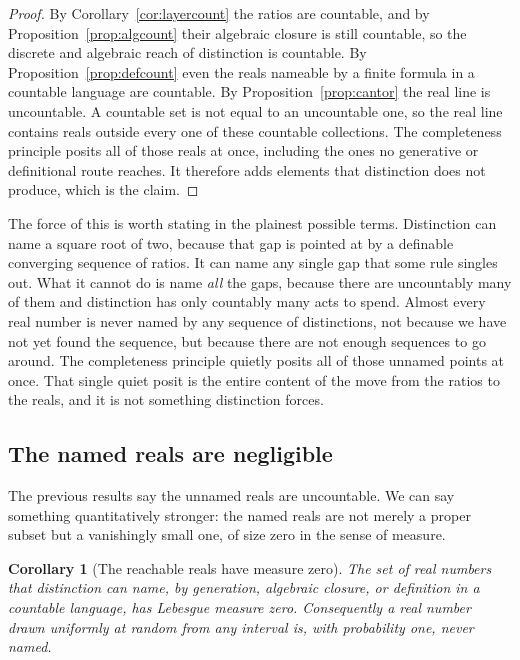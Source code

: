 \documentclass[11pt,a4paper]{article}
\newtheorem{corollary}[theorem]{Corollary}
\theoremstyle{definition}
\theoremstyle{remark}
\begin{document}
\begin{proof}
By Corollary~\ref{cor:layercount} the ratios are countable, and by
Proposition~\ref{prop:algcount} their algebraic closure is still countable, so
the discrete and algebraic reach of distinction is countable. By
Proposition~\ref{prop:defcount} even the reals nameable by a finite formula in a
countable language are countable. By Proposition~\ref{prop:cantor} the real line
is uncountable. A countable set is not equal to an uncountable one, so the real
line contains reals outside every one of these countable collections. The
completeness principle posits all of those reals at once, including the ones no
generative or definitional route reaches. It therefore adds elements that
distinction does not produce, which is the claim.
\end{proof}

The force of this is worth stating in the plainest possible terms. Distinction
can name a square root of two, because that gap is pointed at by a definable
converging sequence of ratios. It can name any single gap that some rule
singles out. What it cannot do is name \emph{all} the gaps, because there are
uncountably many of them and distinction has only countably many acts to spend.
Almost every real number is never named by any sequence of distinctions, not
because we have not yet found the sequence, but because there are not enough
sequences to go around. The completeness principle quietly posits all of those
unnamed points at once. That single quiet posit is the entire content of the
move from the ratios to the reals, and it is not something distinction forces.

\subsection{The named reals are negligible}

The previous results say the unnamed reals are uncountable. We can say something
quantitatively stronger: the named reals are not merely a proper subset but a
vanishingly small one, of size zero in the sense of measure.

\begin{corollary}[The reachable reals have measure zero]\label{cor:measure}
The set of real numbers that distinction can name, by generation, algebraic
closure, or definition in a countable language, has Lebesgue measure zero.
Consequently a real number drawn uniformly at random from any interval is, with
probability one, never named.
\end{corollary}
\end{document}
